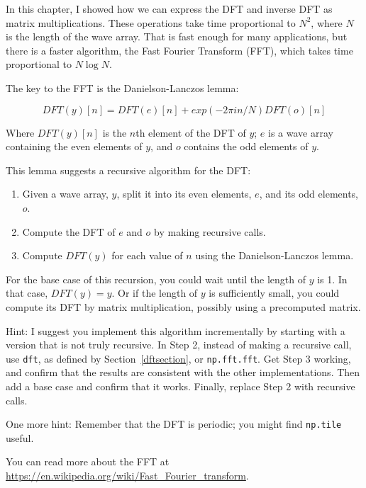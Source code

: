 \documentclass[12pt]{book} \usepackage[width=5.5in,height=8.5in, hmarginratio=3:2,vmarginratio=1:1]{geometry}
\begin{document}
\begin{exercise} In this chapter, I showed how we can express the DFT and inverse DFT as matrix multiplications. These operations take time proportional to $N^2$, where $N$ is the length of the wave array. That is fast enough for many applications, but there is a faster algorithm, the Fast Fourier Transform (FFT), which takes time proportional to $N \log N$. 

The key to the FFT is the Danielson-Lanczos lemma: 

%
\[ DFT(y)[n] = DFT(e)[n] + exp(-2 \pi i n / N) DFT(o)[n] \] 

%
Where $ DFT(y)[n]$ is the $n$th element of the DFT of $y$; $e$ is a wave array containing the even elements of $y$, and $o$ contains the odd elements of $y$. 

This lemma suggests a recursive algorithm for the DFT: 

\begin{enumerate} 

\item Given a wave array, $y$, split it into its even elements, $e$, and its odd elements, $o$. 

\item Compute the DFT of $e$ and $o$ by making recursive calls. 

\item Compute $DFT(y)$ for each value of $n$ using the Danielson-Lanczos lemma. 

\end{enumerate} 

For the base case of this recursion, you could wait until the length of $y$ is 1. In that case, $DFT(y) = y$. Or if the length of $y$ is sufficiently small, you could compute its DFT by matrix multiplication, possibly using a precomputed matrix. 

Hint: I suggest you implement this algorithm incrementally by starting with a version that is not truly recursive. In Step 2, instead of making a recursive call, use {\tt dft}, as defined by Section~\ref{dftsection}, or {\tt np.fft.fft}. Get Step 3 working, and confirm that the results are consistent with the other implementations. Then add a base case and confirm that it works. Finally, replace Step 2 with recursive calls. 

One more hint: Remember that the DFT is periodic; you might find {\tt np.tile} useful. 

You can read more about the FFT at \url{https://en.wikipedia.org/wiki/Fast_Fourier_transform}. 

\end{exercise} 
\end{document}
